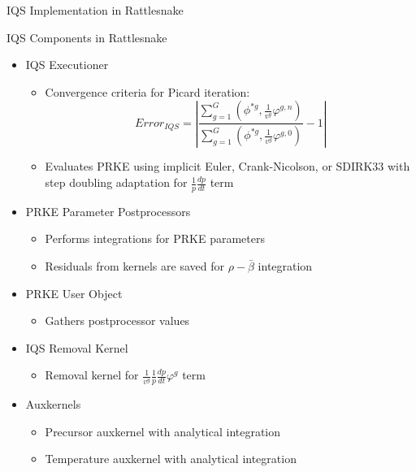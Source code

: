 \documentclass[8pt,xcolor=dvipnames]{beamer}
\newcommand{\be}{\begin{equation*}}
\newcommand{\ee}{\end{equation*}}
\begin{document}
\begin{frame}{IQS Implementation in Rattlesnake}

\begin{block}{IQS Components in Rattlesnake}
\begin{itemize}
\item IQS Executioner
	\begin{itemize}
	\item Convergence criteria for Picard iteration:
	\be
	Error_{IQS}=\left|\frac{\sum_{g=1}^G\left(\phi^{*g},\frac{1}{v^g}\varphi^{g,n}\right)}{\sum_{g=1}^G\left(\phi^{*g},\frac{1}{v^g}\varphi^{g,0}\right)}-1\right|
	\ee
	\item Evaluates PRKE using implicit Euler, Crank-Nicolson, or SDIRK33 with step doubling adaptation for $\frac{1}{p}\frac{dp}{dt}$ term
	\end{itemize}
\item PRKE Parameter Postprocessors
	\begin{itemize}
	\item Performs integrations for PRKE parameters
	\item Residuals from kernels are saved for $\rho-\bar{\beta}$ integration
	\end{itemize}
\item PRKE User Object
	\begin{itemize}
	\item Gathers postprocessor values
	\end{itemize}
\item IQS Removal Kernel
	\begin{itemize}
	\item Removal kernel for $\frac{1}{v^g}\frac{1}{p}\frac{dp}{dt}\varphi^g$ term
	\end{itemize}
\item Auxkernels
	\begin{itemize}
	\item Precursor auxkernel with analytical integration
	\item Temperature auxkernel with analytical integration
	\end{itemize}
\end{itemize}
\end{block}

\end{frame}
\end{document}
